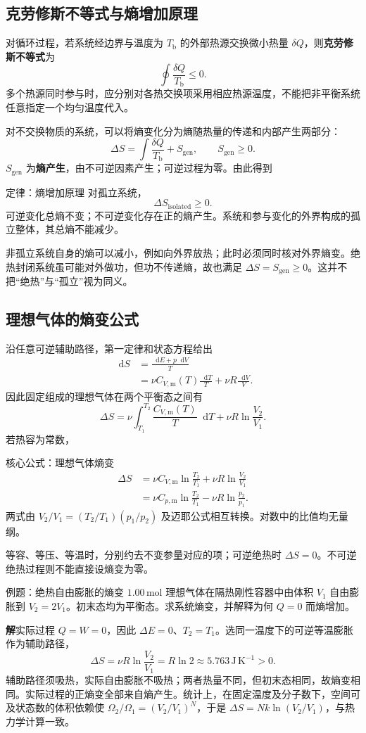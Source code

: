 \documentclass[UTF8,fontset=none,zihao=-4,a4paper]{ctexart}
\newcommand{\term}[1]{\textbf{#1}}
\newcommand{\dd}{\mathop{}\!\mathrm{d}}
\newcommand{\unit}[1]{\,\mathrm{#1}}
\newcommand{\sol}{\par\noindent\textbf{解}\quad}
\begin{document}
\subsection{克劳修斯不等式与熵增加原理}
对循环过程，若系统经边界与温度为 $T_{\mathrm b}$ 的外部热源交换微小热量 $\delta Q$，则\term{克劳修斯不等式}为
\[
 \oint\frac{\delta Q}{T_{\mathrm b}}\le0.
\]
多个热源同时参与时，应分别对各热交换项采用相应热源温度，不能把非平衡系统任意指定一个均匀温度代入。

对不交换物质的系统，可以将熵变化分为熵随热量的传递和内部产生两部分：
\[
 \Delta S=\int\frac{\delta Q}{T_{\mathrm b}}+S_{\mathrm{gen}},
 \qquad S_{\mathrm{gen}}\ge0.
\]
$S_{\mathrm{gen}}$ 为\term{熵产生}，由不可逆因素产生；可逆过程为零。由此得到
\begin{infobox}{定律：熵增加原理}
对孤立系统，
\[
 \Delta S_{\mathrm{isolated}}\ge0.
\]
可逆变化总熵不变；不可逆变化存在正的熵产生。系统和参与变化的外界构成的孤立整体，其总熵不能减少。
\end{infobox}
非孤立系统自身的熵可以减小，例如向外界放热；此时必须同时核对外界熵变。绝热封闭系统虽可能对外做功，但功不传递熵，故也满足 $\Delta S=S_{\mathrm{gen}}\ge0$。这并不把“绝热”与“孤立”视为同义。

\subsection{理想气体的熵变公式}
沿任意可逆辅助路径，第一定律和状态方程给出
\begin{align*}
 \dd S&=\frac{\dd E+p\dd V}{T}\\
 &=\nu C_{V,\mathrm m}(T)\frac{\dd T}{T}
 +\nu R\frac{\dd V}{V}.
\end{align*}
因此固定组成的理想气体在两个平衡态之间有
\[
 \Delta S=\nu\int_{T_1}^{T_2}\frac{C_{V,\mathrm m}(T)}T\dd T
 +\nu R\ln\frac{V_2}{V_1}.
\]
若热容为常数，
\begin{infobox}{核心公式：理想气体熵变}
\begin{align*}
 \Delta S&=\nu C_{V,\mathrm m}\ln\frac{T_2}{T_1}
 +\nu R\ln\frac{V_2}{V_1}\\
 &=\nu C_{p,\mathrm m}\ln\frac{T_2}{T_1}
 -\nu R\ln\frac{p_2}{p_1}.
\end{align*}
两式由 $V_2/V_1=(T_2/T_1)(p_1/p_2)$ 及迈耶公式相互转换。对数中的比值均无量纲。
\end{infobox}
等容、等压、等温时，分别约去不变参量对应的项；可逆绝热时 $\Delta S=0$。不可逆绝热过程则不能直接设熵变为零。

\begin{infobox}{例题：绝热自由膨胀的熵变}
$1.00\unit{mol}$ 理想气体在隔热刚性容器中由体积 $V_1$ 自由膨胀到 $V_2=2V_1$。初末态均为平衡态。求系统熵变，并解释为何 $Q=0$ 而熵增加。
\end{infobox}
\sol 实际过程 $Q=W=0$，因此 $\Delta E=0$、$T_2=T_1$。选同一温度下的可逆等温膨胀作为辅助路径，
\[
 \Delta S=\nu R\ln\frac{V_2}{V_1}
 =R\ln2\approx5.763\unit{J\,K^{-1}}>0.
\]
辅助路径须吸热，实际自由膨胀不吸热；两者热量不同，但初末态相同，故熵变相同。实际过程的正熵变全部来自熵产生。统计上，在固定温度及分子数下，空间可及状态数的体积依赖使 $\Omega_2/\Omega_1=(V_2/V_1)^N$，于是 $\Delta S=Nk\ln(V_2/V_1)$，与热力学计算一致。
\end{document}
